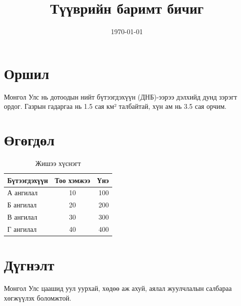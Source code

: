 \documentclass[12pt,a4paper]{article}
\title{Түүврийн баримт бичиг}
\author{}
\date{\today}
\begin{document}
\maketitle

\section{Оршил}

Монгол Улс нь дотоодын нийт бүтээгдэхүүн (ДНБ)-ээрээ дэлхийд дунд зэрэгт ордог. Газрын гадаргаа нь 1.5 сая км² талбайтай, хүн ам нь 3.5 сая орчим.

\section{Өгөгдөл}

\begin{table}[h]
\centering
\begin{tabular}{lcr}
\toprule
\textbf{Бүтээгдэхүүн} & \textbf{Тоо хэмжээ} & \textbf{Үнэ} \\
\midrule
А ангилал & 10 & 100 \\
Б ангилал & 20 & 200 \\
В ангилал & 30 & 300 \\
Г ангилал & 40 & 400 \\
\bottomrule
\end{tabular}
\caption{Жишээ хүснэгт}
\end{table}

\section{Дүгнэлт}

Монгол Улс цаашид уул уурхай, хөдөө аж ахуй, аялал жуулчлалын салбараа хөгжүүлэх боломжтой.
\end{document}
